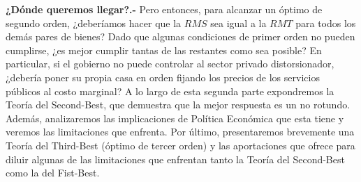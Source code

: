 \documentclass[10pt,a4paper]{article}
\begin{document}
\textbf{¿Dónde queremos llegar?.-} Pero entonces, para alcanzar un óptimo de segundo orden, ¿deberíamos hacer que la $RMS$ sea igual a la $RMT$ para todos los demás pares de bienes? Dado que algunas condiciones de primer orden no pueden cumplirse, ¿es mejor cumplir tantas de las restantes como sea posible? En particular, si el gobierno no puede controlar al sector privado distorsionador, ¿debería poner su propia casa en orden fijando los precios de los servicios públicos al costo marginal? A lo largo de esta segunda parte expondremos la Teoría del Second-Best, que demuestra que la mejor respuesta es un no rotundo. Además, analizaremos las implicaciones de Política Económica que esta tiene y veremos las limitaciones que enfrenta. Por último, presentaremos brevemente una Teoría del Third-Best (óptimo de tercer orden) y las aportaciones que ofrece para diluir algunas de las limitaciones que enfrentan tanto la Teoría del Second-Best como la del Fist-Best.
\end{document}
